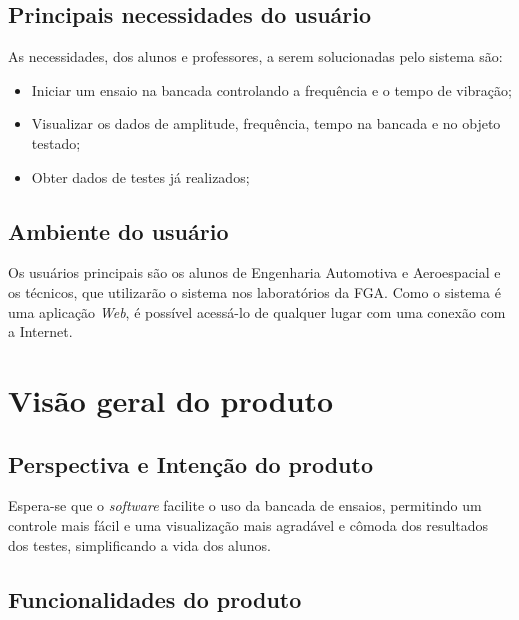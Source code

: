 \begin{apendicesenv}
     \subsection*{Principais necessidades do usuário}
     As necessidades, dos alunos e professores, a serem solucionadas pelo sistema são:
     \begin{itemize}
		\item Iniciar um ensaio na bancada controlando a frequência e o tempo de vibração;
        \item Visualizar os dados de amplitude, frequência, tempo na bancada e no objeto testado;
        \item Obter dados de testes já realizados;
    \end{itemize}
    
     
	\subsection*{Ambiente do usuário}
    	
        Os usuários principais são os alunos de Engenharia Automotiva e Aeroespacial e os técnicos, que utilizarão o sistema nos laboratórios da FGA. Como o sistema é uma aplicação \textit{Web}, é possível acessá-lo de qualquer lugar com uma conexão com a Internet.
        
   
\section*{Visão geral do produto}

	\subsection*{Perspectiva e Intenção do produto}
    	Espera-se que o \textit{software} facilite o uso da bancada de ensaios, permitindo um controle mais fácil e uma visualização mais agradável e cômoda dos resultados dos testes, simplificando a vida dos alunos.
        
    \subsection*{Funcionalidades do produto}
    

\end{apendicesenv}
